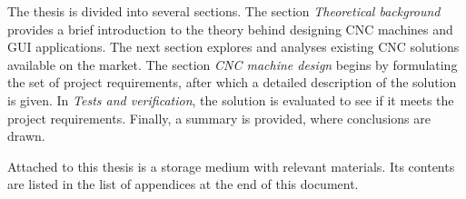 The thesis is divided into several sections. The section \textit{Theoretical
background} provides a brief introduction to the theory behind designing CNC
machines and GUI applications. The next section explores and analyses existing
CNC solutions available on the market. The section \textit{CNC machine design}
begins by formulating the set of project requirements, after which a detailed
description of the solution is given. In \textit{Tests and verification}, the
solution is evaluated to see if it meets the project requirements. Finally, a
summary is provided, where conclusions are drawn.

Attached to this thesis is a storage medium with relevant materials. Its
contents are listed in the list of appendices at the end of this document.
